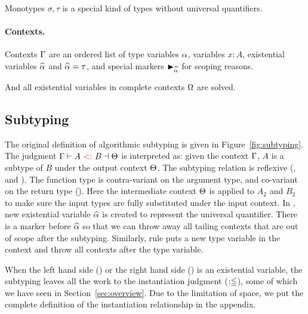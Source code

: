Monotypes $\sigma, \tau$ is a special kind of types without universal
quantifiers.

\paragraph{Contexts.}
Contexts $\Gamma$ are an ordered list of type variables $\alpha$, variables $x:
A$, existential variables $\widehat{\alpha}$ and $\widehat{\alpha} = \tau$, and special markers
$\blacktriangleright_{\widehat{\alpha}}$ for scoping reasons.

And all existential variables in complete contexts $\Omega$ are solved.


\subsection{Subtyping}

\begin{figure*}[t]
  \caption{Algorithmic Subtyping (Original).}
  \label{fig:subtyping}
\end{figure*}

The original definition of algorithmic subtyping is given in
Figure~\ref{fig:subtyping}. The judgment $\tctx \bysub A \tsub B \toctx$ is
interpreted as: given the context $\Gamma$, $A$ is a subtype of $B$ under the
output context $\Theta$.
The subtyping relation is reflexive (,  and
). The function type is contra-variant on the argument type,
and co-variant on the return type (\rul{$\to$}). Here the intermediate context
$\Theta$ is applied to $A_2$ and $B_2$ to make sure the input types are fully
substituted under the input context. In , new existential
variable $\widehat{\alpha}$ is created to represent the universal quantifier. There is a
marker before $\widehat{\alpha}$ so that we can throw away all tailing contexts that are
out of scope after the subtyping. Similarly, rule  puts a
new type variable in the context and throw all contexts after the type variable.

When the left hand side () or the right hand side () is an
existential variable, the subtyping leaves all the work to the instantiation
judgment ($:\leqq$), some of which we have seen in Section~\ref{sec:overview}. Due
to the limitation of space, we put the complete definition of the instantiation
relationship in the appendix.

